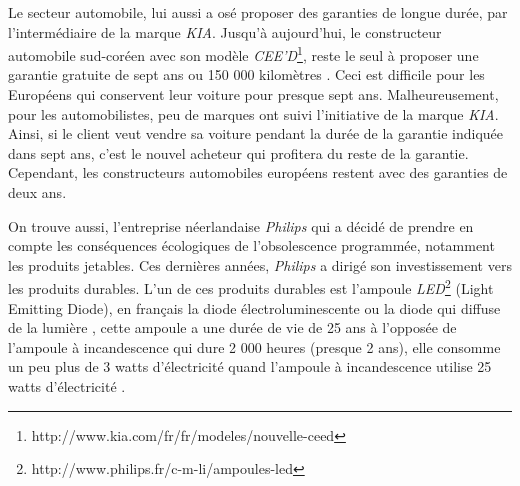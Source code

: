 \bigbreak
Le secteur automobile, lui aussi a osé proposer des garanties de longue durée, par l'intermédiaire de la marque \textit{KIA}. Jusqu'à aujourd'hui, le constructeur automobile sud-coréen avec son modèle \textit{CEE'D}\footnote{http://www.kia.com/fr/fr/modeles/nouvelle-ceed}, reste le seul à proposer une garantie gratuite de sept ans ou 150 000 kilomètres \cite{kia}. Ceci est difficile pour les Européens qui conservent leur voiture pour presque sept ans. Malheureusement, pour les automobilistes, peu de marques ont suivi l’initiative de la marque \textit{KIA}. Ainsi, si le client veut vendre sa voiture pendant la durée de la garantie indiquée dans sept ans, c'est le nouvel acheteur qui profitera du reste de la garantie. Cependant, les constructeurs automobiles européens restent avec des garanties de deux ans.

\bigbreak
On trouve aussi, l'entreprise néerlandaise \textit{Philips} qui a décidé de prendre en compte les conséquences écologiques de l'obsolescence programmée, notamment les produits jetables. Ces dernières années, \textit{Philips} a dirigé son investissement vers  les produits durables. L'un de ces produits durables est l'ampoule \textit{LED}\footnote{http://www.philips.fr/c-m-li/ampoules-led} (Light Emitting Diode), en français la diode électrolumi\-nescente ou la diode qui  diffuse de la lumière , cette ampoule a une durée de vie de 25 ans à l'opposée de l'ampoule à incandescence qui dure 2 000 heures (presque 2 ans), elle consomme un peu plus de 3 watts d’électricité quand l'ampoule à incandescence utilise 25 watts d’électricité \cite{ampoule_inc}. 


